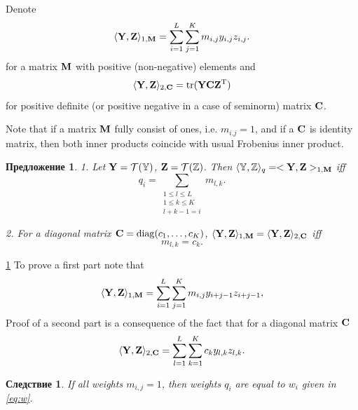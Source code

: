 \documentclass[12pt,a4paper,fleqn,leqno]{article}
\DeclareMathOperator{\tr}{tr}
\newtheorem{corollary}{Следствие}
\newtheorem{proposition}{Предложение}
\begin{document}
Denote
\begin{equation}
\label{eq:norm1M}
    \langle\mathbf{Y},\mathbf{Z}\rangle_{1,\mathbf{M}} = \sum_{i = 1}^L \sum_{j=1}^K m_{i,j} y_{i,j} z_{i,j}.
\end{equation}
for a matrix $\mathbf{M}$ with positive (non-negative) elements and
\begin{equation}
\label{eq:norm2S}
    \langle\bfY,\bfZ\rangle_{2,\bfC} = \tr(\bfY \bfC \bfZ^\rmT)
\end{equation}
for positive definite (or positive negative in a case of seminorm) matrix $\mathbf{C}$.

Note that if a matrix $\mathbf{M}$ fully consist of ones, i.e. $m_{i.j}=1$,
and if a $\mathbf{C}$ is identity matrix, then both inner products coincide with usual Frobenius inner product.

\begin{proposition}
\label{prop:equiv_tasks}
1. Let $\mathbf{Y} = \mathcal{T}(\mathbb{Y})$,  $\mathbf{Z} = \mathcal{T}(\mathbb{Z})$. Then $\langle\mathbb{Y},\mathbb{Z}\rangle_q= <\mathbf{Y},\mathbf{Z}>_{1,\mathbf{M}}$ iff
\begin{equation}\label{qi_mi}
q_i = \sum_{\substack{1 \le l \le L \\ 1 \le k \le K \\ l+k-1=i}} m_{l,k}.
\end{equation}

2. For a diagonal matrix $\mathbf{C}=\mathop{\mathrm{diag}}(c_1,\ldots,c_K)$, $\langle\mathbf{Y},\mathbf{Z}\rangle_{1,\mathbf{M}}= \langle\mathbf{Y},\mathbf{Z}\rangle_{2,\mathbf{C}}$ iff
\begin{equation}\label{sk_mlk}
m_{l,k}=c_k.
\end{equation}
\end{proposition}
\begin{proof5}{\ref{prop:equiv_tasks}}
To prove a first part note that
\begin{equation*}
\langle \mathbf{Y}, \mathbf{Z} \rangle_{1,\mathbf{M}} = \sum_{i = 1}^L \sum_{j = 1}^K m_{i,j} y_{i + j - 1} z_{i + j - 1},
\end{equation*}
Proof of a second part is a consequence of the fact that for a diagonal matrix $\mathbf{C}$
\begin{equation*}
\langle \mathbf{Y}, \mathbf{Z} \rangle_{2,\mathbf{C}} = \sum_{l=1}^L \sum_{k=1}^K c_k y_{l,k} z_{l, k}.
\end{equation*}
\end{proof5}

\begin{corollary}
\label{cor:base_weights}
If all weights $m_{i,j}=1$, then weights $q_i$ are equal to $w_i$ given in \eqref{eq:w}.
\end{corollary}
\end{document}
